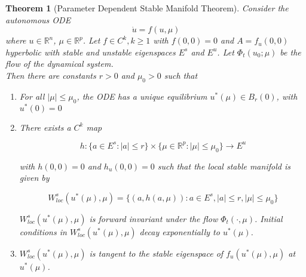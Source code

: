 \documentclass{article}
\newtheorem{theorem}{Theorem}[section]
\def\R{{\mathbb R}}
\begin{document}
\begin{theorem}[Parameter Dependent Stable Manifold Theorem]
Consider the autonomous ODE
\begin{equation}
\dot{u} = f(u, \mu)
\end{equation}
where $u \in \R^n$, $\mu \in \R^p$. Let $f \in C^k, k \geq 1$ with $f(0, 0) = 0$ and $A = f_u(0, 0)$ hyperbolic with stable and unstable eigenspaces $E^s$ and $E^u$. Let $\Phi_t(u_0; \mu)$ be the flow of the dynamical system. \\

Then there are constants $r > 0$ and $\mu_0 > 0$ such that

\begin{enumerate}
\item For all $|\mu| \leq \mu_0$, the ODE has a unique equilibrium $u^*(\mu) \in B_r(0)$, with $u^*(0) = 0$

\item There exists a $C^k$ map 

\[
h : \{ a \in E^s: |a| \leq r \} \times \{ \mu \in \R^p : |\mu| \leq \mu_0 \} \rightarrow E^u
\]

with $h(0, 0) = 0$ and $h_u(0, 0) = 0$ such that the local stable manifold is given by

\[
W^s_{loc}(u^*(\mu), \mu) = \{ (a, h(a, \mu)) : a \in E^s, |a| \leq r, |\mu| \leq \mu_0 \}
\]

$W^s_{loc}(u^*(\mu), \mu)$ is forward invariant under the flow $\Phi_t(\cdot, \mu)$. Initial conditions in $W^s_{loc}(u^*(\mu), \mu)$ decay exponentially to $u^*(\mu)$.\\

\item $W^s_{loc}(u^*(\mu), \mu)$ is tangent to the stable eigenspace of $f_u(u^*(\mu),\mu)$ at $u^*(\mu)$.
\end{enumerate}
\end{theorem}
\end{document}
